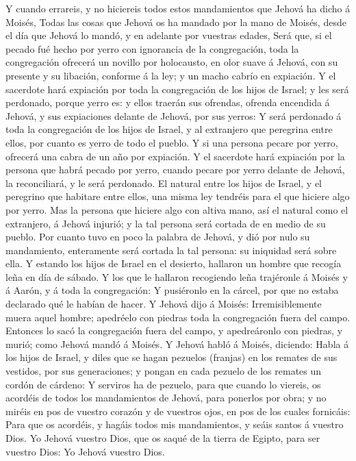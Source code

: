 Y cuando errareis, y no hiciereis todos estos
mandamientos que Jehová ha dicho á Moisés,  Todas las
cosas que Jehová os ha mandado por la mano de Moisés, desde el día que
Jehová lo mandó, y en adelante por vuestras edades,  Será
que, si el pecado fué hecho por yerro con ignorancia de la congregación,
toda la congregación ofrecerá un novillo por holocausto, en olor suave á
Jehová, con su presente y su libación, conforme á la ley; y un macho
cabrío en expiación.  Y el sacerdote hará expiación por
toda la congregación de los hijos de Israel; y les será perdonado,
porque yerro es: y ellos traerán sus ofrendas, ofrenda encendida á
Jehová, y sus expiaciones delante de Jehová, por sus yerros:
 Y será perdonado á toda la congregación de los hijos de
Israel, y al extranjero que peregrina entre ellos, por cuanto es yerro
de todo el pueblo.  Y si una persona pecare por yerro,
ofrecerá una cabra de un año por expiación.  Y el
sacerdote hará expiación por la persona que habrá pecado por yerro,
cuando pecare por yerro delante de Jehová, la reconciliará, y le será
perdonado.  El natural entre los hijos de Israel, y el
peregrino que habitare entre ellos, una misma ley tendréis para el que
hiciere algo por yerro.  Mas la persona que hiciere algo
con altiva mano, así el natural como el extranjero, á Jehová injurió; y
la tal persona será cortada de en medio de su pueblo. 
Por cuanto tuvo en poco la palabra de Jehová, y dió por nulo su
mandamiento, enteramente será cortada la tal persona: su iniquidad será
sobre ella.  Y estando los hijos de Israel en el
desierto, hallaron un hombre que recogía leña en día de sábado.
 Y los que le hallaron recogiendo leña trajéronle á
Moisés y á Aarón, y á toda la congregación:  Y pusiéronlo
en la cárcel, por que no estaba declarado qué le habían de hacer.
 Y Jehová dijo á Moisés: Irremisiblemente muera aquel
hombre; apedréelo con piedras toda la congregación fuera del campo.
 Entonces lo sacó la congregación fuera del campo, y
apedreáronlo con piedras, y murió; como Jehová mandó á Moisés.
 Y Jehová habló á Moisés, diciendo:  Habla
á los hijos de Israel, y diles que se hagan pezuelos (franjas) en los
remates de sus vestidos, por sus generaciones; y pongan en cada pezuelo
de los remates un cordón de cárdeno:  Y serviros ha de
pezuelo, para que cuando lo viereis, os acordéis de todos los
mandamientos de Jehová, para ponerlos por obra; y no miréis en pos de
vuestro corazón y de vuestros ojos, en pos de los cuales fornicáis:
 Para que os acordéis, y hagáis todos mis mandamientos, y
seáis santos á vuestro Dios.  Yo Jehová vuestro Dios, que
os saqué de la tierra de Egipto, para ser vuestro Dios: Yo Jehová
vuestro Dios.

